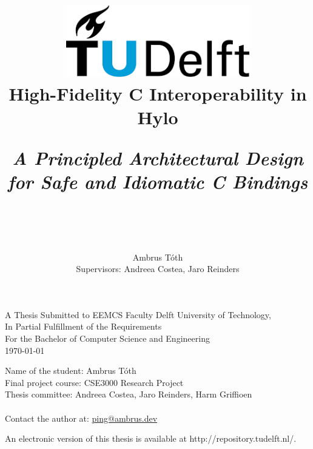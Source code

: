 \title{
    \includegraphics[width=8cm, keepaspectratio]{tudelftlogo.png}\\
    \vspace*{2cm}
    \textbf{
        {High-Fidelity C Interoperability in Hylo}
    }\\
    \vspace*{0.5cm}
    
    \parbox{0.8\linewidth}{
        \centering
        \textit{A Principled Architectural Design for Safe and Idiomatic C Bindings}
    }\\

    \vspace*{1cm}


    \author{
        Ambrus Tóth\\
        Supervisors: Andreea Costea, Jaro Reinders
    }
}


\date{}

\maketitle
\thispagestyle{empty}

\let\clearpagebackup\clearpage
\renewcommand{\clearpage}{ }

\onecolumn

\vspace*{1.5cm}
\begin{center}
    A Thesis Submitted to EEMCS Faculty Delft University of Technology,\\
    In Partial Fulfillment of the Requirements\\
    For the Bachelor of Computer Science and Engineering\\
    \today
\end{center}

\vspace*{2cm}

\noindent
{\small
Name of the student: Ambrus Tóth\\
Final project course: CSE3000 Research Project\\
Thesis committee: Andreea Costea, Jaro Reinders, Harm Griffioen\\ \\
Contact the author at: \href{mailto:ping@ambrus.dev}{ping@ambrus.dev}
}
\vfill

\begin{center}
    An electronic version of this thesis is available at http://repository.tudelft.nl/.
\end{center}

\twocolumn
\let\clearpage\clearpagebackup  
\clearpage
\setcounter{page}{1}
